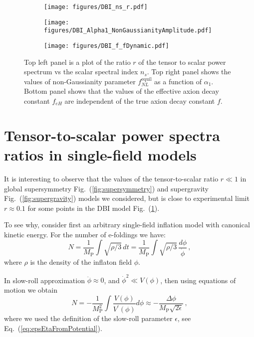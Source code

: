 \documentclass[12pt]{article}
\begin{document}
\begin{figure}
  \centering
  \begin{subfigure}{0.45 \textwidth}
    \texttt{[image: figures/DBI\_ns\_r.pdf]}
  \end{subfigure}
  \begin{subfigure}{0.45 \textwidth}
    \texttt{[image: figures/DBI\_Alpha1\_NonGaussianityAmplitude.pdf]}
  \end{subfigure}
  \begin{subfigure}{0.45 \textwidth}
    \texttt{[image: figures/DBI\_f\_fDynamic.pdf]}
  \end{subfigure}
  \caption{\protect
    Top left panel is a plot of the ratio $r$ of the tensor to scalar power spectrum vs the scalar spectral index $n_s$.
    Top right panel shows the values of non-Gaussianity parameter $f_{NL}^\text{equil}$ as a function of $\alpha_1$.
    Bottom panel shows that the values of the effective axion decay constant $f_{eH}$ are independent of the true axion decay constant $f$.} \label{fig:DBI}
\end{figure}


\section{Tensor-to-scalar power spectra ratios in single-field models \label{sec:r}}
It is interesting to observe that the values of the tensor-to-scalar ratio $r \ll 1$ in global supersymmetry Fig.~(\ref{fig:supersymmetry}) and supergravity Fig.~(\ref{fig:supergravity}) models we considered, but is close to experimental limit $r \approx 0.1$ for some points in the DBI model Fig.~(\ref{fig:DBI}).

To see why, consider first an arbitrary single-field inflation model with canonical kinetic energy.
For the number of e-foldings we have:
\begin{equation} \label{eq:efoldingsGeneral}
  N = \frac{1}{M_\text{P}} \int \sqrt{\rho / 3}\,dt
    = \frac{1}{M_\text{P}} \int \sqrt{\rho / 3}\,\frac{d\phi}{\dot \phi}\,,
\end{equation}
where $\rho$ is the density of the inflaton field $\phi$.

In slow-roll approximation $\ddot \phi \approx 0$, and ${\dot \phi}^2 \ll V\left(\phi\right)$, then using equations of motion we obtain
\begin{equation} \label{eq:efoldingsCanonical}
  N = - \frac{1}{M_\text{P}^2} \int \frac{V\left(\phi\right)}{V^\prime\left(\phi\right)} d\phi
    \approx - \frac{\Delta \phi}{M_\text{P} \sqrt{2 \epsilon}}\,,
\end{equation}
where we used the definition of the slow-roll parameter $\epsilon$, see Eq.~(\ref{eq:epsEtaFromPotential}).
\end{document}
